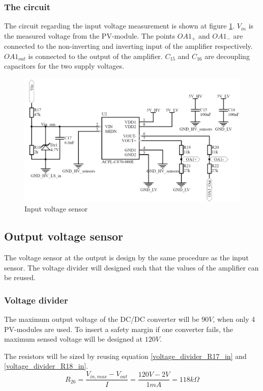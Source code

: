 \subsubsection{The circuit}
The circuit regarding the input voltage measurement is shown at figure \ref{fig:input_voltage_sensor_circuit}. $V_{in}$ is the measured voltage from the PV-module. The points $OA1_+$ and $OA1_-$ are connected to the non-inverting and inverting input of the amplifier respectively. $OA1_{out}$ is connected to the output of the amplifier. $C_{15}$ and $C_{16}$ are decoupling capacitors for the two supply voltages. 

\begin{figure}[htbp]
	\begin{center}
		\includegraphics[width=0.7\linewidth]{../Pictures/P1/Sensors/input_voltage_sensor.PNG}
		\caption{Input voltage sensor}
		\label{fig:input_voltage_sensor_circuit}
	\end{center}
\end{figure}

\subsection{Output voltage sensor}
The voltage sensor at the output is design by the same procedure as the input sensor. The voltage divider will designed such that the values of the amplifier can be reused.

\subsubsection{Voltage divider}
The maximum output voltage of the DC/DC converter will be $90V$, when only 4 PV-modules are used. To insert a safety margin if one converter fails, the maximum sensed voltage will be designed at $120V$.

The resistors will be sized by reusing equation \ref{voltage_divider_R17_in} and \ref{voltage_divider_R18_in}.
\begin{equation}
	R_{26} = \frac{V_{in,max}-V_{out}}{I} = \frac{120V-2V}{1mA} = 118k\Omega	
\end{equation}

